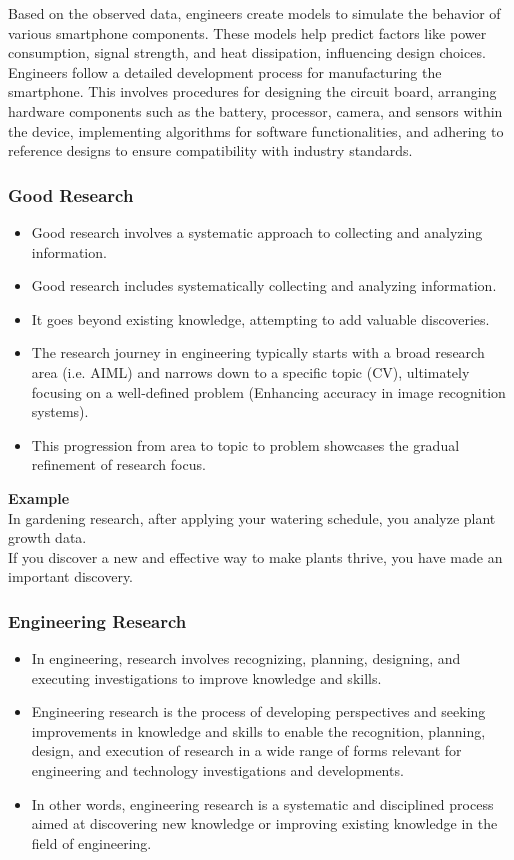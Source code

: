 \documentclass{article}
\begin{document}
	\noindent Based on the observed data, engineers create models to simulate the behavior of various
	smartphone components.
	These models help predict factors like power consumption, signal strength, and heat dissipation,
	influencing design choices. \\

	\noindent Engineers follow a detailed development process for manufacturing the smartphone.
	This involves procedures for designing the circuit board, arranging hardware components such as the
	battery, processor, camera, and sensors within the device, implementing algorithms for software
	functionalities, and adhering to reference designs to ensure compatibility with industry standards.

	\subsubsection{Good Research}
	\begin{itemize}
		\item Good research involves a systematic approach to collecting and analyzing information.
		\item Good research includes systematically collecting and analyzing information.
		\item It goes beyond existing knowledge, attempting to add valuable discoveries.
		\item The research journey in engineering typically starts with a broad research area (i.e. AIML) and
			narrows down to a specific topic (CV), ultimately focusing on a well-defined problem
			(Enhancing accuracy in image recognition systems).
		\item This progression from area to topic to problem showcases the gradual refinement of research focus.
	\end{itemize}

	\noindent \textbf{Example} \\
	In gardening research, after applying your watering schedule, you analyze plant growth data. \\
	If you discover a new and effective way to make plants thrive, you have made an important discovery.

	\subsubsection{Engineering Research}
	\begin{itemize}
		\item In engineering, research involves recognizing, planning, designing, and executing investigations
			to improve knowledge and skills.
		\item Engineering research is the process of developing perspectives and seeking improvements in
			knowledge and skills to enable the recognition, planning, design, and execution of research in a
			wide range of forms relevant for engineering and technology investigations and developments.
		\item In other words, engineering research is a systematic and disciplined process aimed at discovering
			new knowledge or improving existing knowledge in the field of engineering.
	\end{itemize}
\end{document}
